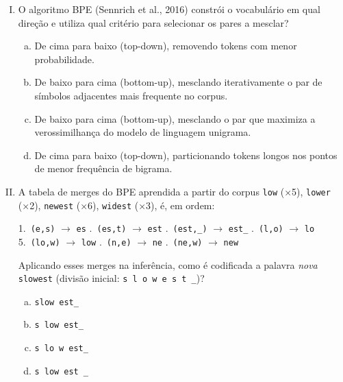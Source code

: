 \documentclass{dlproblemset}
\begin{document}
\begin{enumerate}[I)]
\item O algoritmo BPE (Sennrich et al., 2016) constrói o vocabulário em qual direção
      e utiliza qual critério para selecionar os pares a mesclar?

\begin{enumerate}[a)]
    \item De cima para baixo (top-down), removendo tokens com menor probabilidade.
    \item De baixo para cima (bottom-up), mesclando iterativamente o par de símbolos
          adjacentes mais frequente no corpus.
    \item De baixo para cima (bottom-up), mesclando o par que maximiza a verossimilhança
          do modelo de linguagem unigrama.
    \item De cima para baixo (top-down), particionando tokens longos nos pontos de
          menor frequência de bigrama.
\end{enumerate}

\item A tabela de merges do BPE aprendida a partir do corpus
      \texttt{low} (×5), \texttt{lower} (×2), \texttt{newest} (×6), \texttt{widest} (×3),
      é, em ordem:
      \begin{center}
      1.\ \texttt{(e,s)} $\rightarrow$ \texttt{es} .\ \texttt{(es,t)} $\rightarrow$ \texttt{est} .\ \texttt{(est,\_)} $\rightarrow$ \texttt{est\_} .\ \texttt{(l,o)} $\rightarrow$ \texttt{lo} \\
      5.\ \texttt{(lo,w)} $\rightarrow$ \texttt{low} .\ \texttt{(n,e)} $\rightarrow$ \texttt{ne} .\ \texttt{(ne,w)} $\rightarrow$ \texttt{new}
      \end{center}
      Aplicando esses merges na inferência, como é codificada a palavra \emph{nova}
      \texttt{slowest} (divisão inicial: \texttt{s~l~o~w~e~s~t~\_})?

\begin{enumerate}[a)]
    \item \texttt{slow}~\texttt{est\_}
    \item \texttt{s}~\texttt{low}~\texttt{est\_}
    \item \texttt{s}~\texttt{lo}~\texttt{w}~\texttt{est\_}
    \item \texttt{s}~\texttt{low}~\texttt{est}~\texttt{\_}
\end{enumerate}


\end{enumerate}
\end{document}
